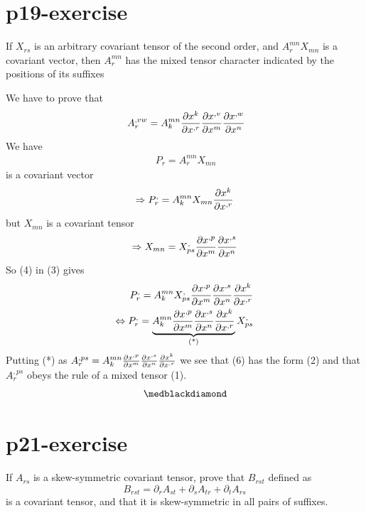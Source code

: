 \section{p19-exercise}
\begin{tcolorbox}
If $X_{rs}$ is an arbitrary covariant tensor of the second order, and $A^{mn}_{r }X_{mn}$ is a covariant vector, then $A^{mn}_{r }$ has the mixed tensor character indicated by the positions of its suffixes 
\end{tcolorbox}
We have to prove that
\begin{align}
\ A^{,vw}_{r} = A^{mn}_k\pdv{x^{k}}{x^{,r}}\pdv{x^{,v}}{x^{m}}\pdv{x^{,w}}{x^{n}} 
\end{align}
We have
\begin{align}
\ P_{r} =A^{mn}_{r }X_{mn}
\end{align}
is a covariant vector
\begin{align}
\Rightarrow P^{,}_{r} =A^{mn}_{k }X_{mn}\pdv{x^{k}}{x^{,r}}
\end{align}
but $X_{mn}$ is a covariant tensor
\begin{align}
\Rightarrow X_{mn} = X^{,}_{ps}\pdv{x^{,p}}{x^{m}}\pdv{x^{,s}}{x^{n}}
\end{align}
So (4) in (3) gives
\begin{align}
\ P^{,}_{r} =A^{mn}_{k }X^{,}_{ps}\pdv{x^{,p}}{x^{m}}\pdv{x^{,s}}{x^{n}}\pdv{x^{k}}{x^{,r}}\\
\Leftrightarrow P^{,}_{r} = \underbrace{A^{mn}_{k }\pdv{x^{,p}}{x^{m}}\pdv{x^{,s}}{x^{n}}\pdv{x^{k}}{x^{,r}}}_\text{(*)}X^{,}_{ps}
\end{align}
Putting (*) as $ A^{,ps}_{r }= A^{mn}_{k }\pdv{x^{,p}}{x^{m}}\pdv{x^{,s}}{x^{n}}\pdv{x^{k}}{x^{,r}}$ we see that (6) has the form (2) and that $A^{,ps}_{r }$ obeys the rule of a mixed tensor (1).
$$\medblackdiamond$$
\pagebreak[4]

\section{p21-exercise}
\begin{tcolorbox}
If $A_{rs}$ is a skew-symmetric covariant tensor, prove that $B_{rst}$ defined as 
$$B_{rst} = \partial_{r}{A_{st}} + \partial_{s}{A_{tr}} +\partial_{t}{A_{rs}} $$ is a covariant tensor, and that it is skew-symmetric in all pairs of suffixes.
\end{tcolorbox}

